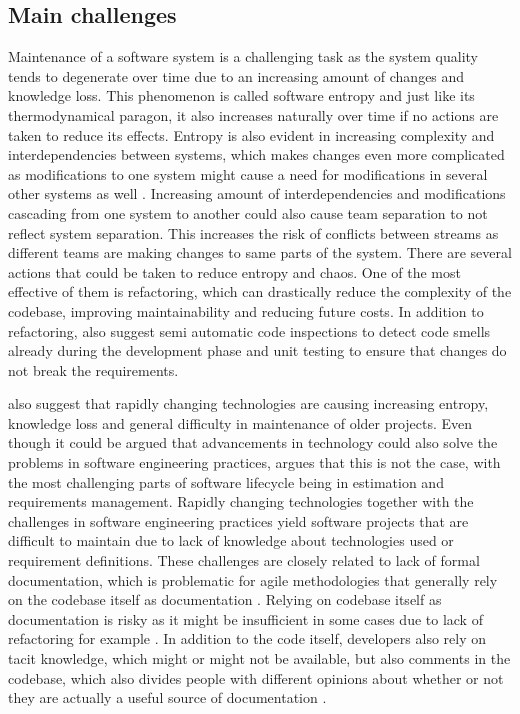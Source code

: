 \subsection{Main challenges}
\label{section:main-maintenance-challenges}

Maintenance of a software system is a challenging task as the system quality tends to degenerate over time due to an increasing amount of changes and knowledge loss. This phenomenon is called
software entropy and just like its thermodynamical paragon, it also increases naturally over time if no actions are taken to reduce its effects. Entropy is also evident in
increasing complexity and interdependencies between systems, which makes changes even more complicated as modifications to one system might cause a need for modifications in several other systems
as well \citep{Hanssen2009}. Increasing amount of interdependencies and modifications cascading from one system to another could also cause team separation to not reflect system separation. This increases the risk of conflicts between streams as different teams are making changes to same parts of the
system. There are several actions that could be taken
to reduce entropy and chaos. One of the most effective of them is refactoring, which can drastically reduce the complexity of the codebase, improving maintainability and reducing future
costs. In addition to refactoring, \citet{Hanssen2009} also suggest semi automatic code inspections to detect code smells already during the development phase and unit testing to ensure
that changes do not break the requirements.

\citet{Richardson2007} also suggest that rapidly changing technologies are causing increasing entropy,
knowledge loss and general difficulty in maintenance of older projects. Even though
it could be argued that advancements in technology could also solve the problems in software engineering practices,
\citet{Demir2009} argues that this is not the case, with the most challenging
parts of software lifecycle being in estimation and requirements management. Rapidly changing technologies together with the challenges in software engineering practices yield software projects
that are difficult to maintain due to lack of knowledge about technologies used or requirement definitions.
These challenges are closely related to lack of formal documentation,
which is problematic for agile methodologies that generally rely on the codebase itself as documentation \citep{Ito2016}\citep{Sommerville2011}\citep{Stettina2013}.
Relying on codebase itself as documentation is risky as it might be insufficient in some cases due to lack of refactoring for example \citep{Hanssen2009}\citep{Tiarks2011}.
In addition to the code itself, developers also rely on tacit knowledge, which might or might not be available, but also comments in the codebase,
which also divides people with different opinions about whether or not they are actually a useful source of documentation \citep{Tiarks2011}.

